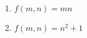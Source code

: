 \documentclass[12pt,letterpaper]{article}
\begin{document}
\begin{enumerate}
\begin{enumerate}
\vspace{15pc}
\item $f(m,n)=mn$

\vspace{15pc}
\item $f(m,n)=n^2+1$
\end{enumerate}




\end{enumerate}
\end{document}
